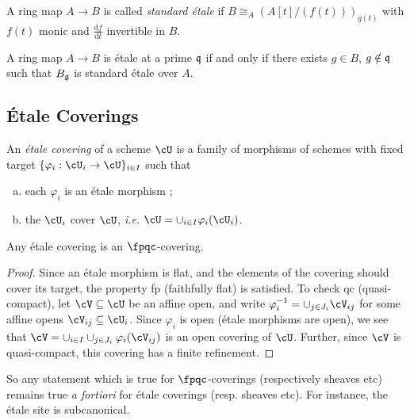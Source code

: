 \begin{defi}
A ring map $A \to B$ is called \emph{standard \'etale} if $B \cong_A \left( A[t]/(f(t)) \right)_{g(t)}$ with $f(t)$ monic and $\frac{\mathrm{d}f}{\mathrm{d}t}$ invertible in $B$.
\end{defi}

\begin{thm}
A ring map $A \to B$ is \'etale at a prime $\frak q$ if and only if there exists $g \in B$, $g \notin \frak q$ such that $B_{\frak g}$ is standard \'etale over $A$.
\end{thm}

\subsection{\'Etale Coverings}

\begin{defi}
An \emph{\'etale covering} of a scheme $\cU$ is a family of morphisms of schemes with fixed target $\{ \varphi_i : \cU_i \to \cU \}_{i \in I}$ such that 
\begin{enumerate}[(a)]
\item each $\varphi_i$ is an \'etale morphism ;
\item the $\cU_i$ cover $\cU$, {\it i.e.} $\cU = \cup_{i\in I}\varphi_i(\cU_i)$.
\end{enumerate}
\end{defi}

\begin{lem}
Any \'etale covering is an $\fpqc$-covering. 
\end{lem}

\begin{proof}
Since an \'etale morphism is flat, and the elements of the covering should cover its target, the property fp (faithfully flat) is satisfied. To check qc (quasi-compact), let $\cV \subseteq \cU$ be an affine open, and write $\varphi_i^{-1} = \cup_{j \in J_i} \cV_{ij}$ for some affine opens $\cV_{ij} \subseteq \cU_i$. Since $\varphi_i$ is open (\'etale morphisms are open), we see that $\cV = \cup_{i\in I}\cup_{j \in J_i} \varphi_i(\cV_{ij})$ is an open covering of $\cU$. Further, since $\cV$ is quasi-compact, this covering has a finite refinement.
\end{proof}

So any statement which is true for $\fpqc$-coverings (respectively sheaves etc) remains true {\it a fortiori} for \'etale coverings (resp. sheaves etc). For instance, the \'etale site is subcanonical.

